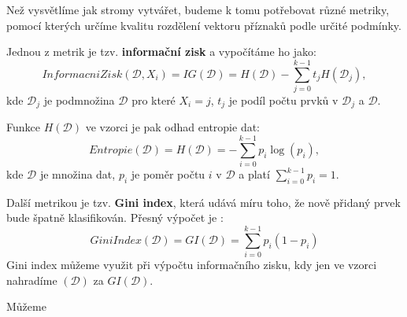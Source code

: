 Než vysvětlíme jak stromy vytvářet, budeme k tomu potřebovat různé metriky, pomocí kterých určíme kvalitu rozdělení vektoru příznaků podle určité podmínky.

Jednou z metrik je tzv. \textbf{informační zisk} a vypočítáme ho jako\cite{decisionTrees}:
\[
InformacniZisk(\mathcal{D},X_i) = IG(\mathcal{D}) = H(\mathcal{D}) - \sum^{k-1}_{j = 0} t_j  H(\mathcal{D}_j),
\]kde $\mathcal{D}_j$ je podmnožina $\mathcal{D}$ pro které $X_i = j$, $t_j$ je podíl počtu prvků v $\mathcal{D}_j$ a $\mathcal{D}$. 

Funkce $H(\mathcal{D})$ ve vzorci je pak odhad entropie dat:
\[
Entropie(\mathcal{D}) = H(\mathcal{D}) = - \sum^{k-1}_{i = 0} p_i  \log(p_i),
\]
kde $\mathcal{D}$ je množina dat, $p_i$ je  poměr počtu $i$ v $\mathcal{D}$ a platí $ \sum^{k-1}_{i = 0} p_i = 1$. 


Další metrikou je tzv. \textbf{Gini index}, která udává míru toho, že nově přidaný prvek bude špatně klasifikován. Přesný výpočet je \cite{vzd}:
\[
GiniIndex(\mathcal{D}) = GI(\mathcal{D}) = \sum^{k-1}_{i = 0} p_i  (1 - p_i) 
\]
Gini index můžeme využit při výpočtu informačního zisku, kdy jen ve vzorci nahradíme $(\mathcal{D})$ za  $GI(\mathcal{D})$.

Můžeme 